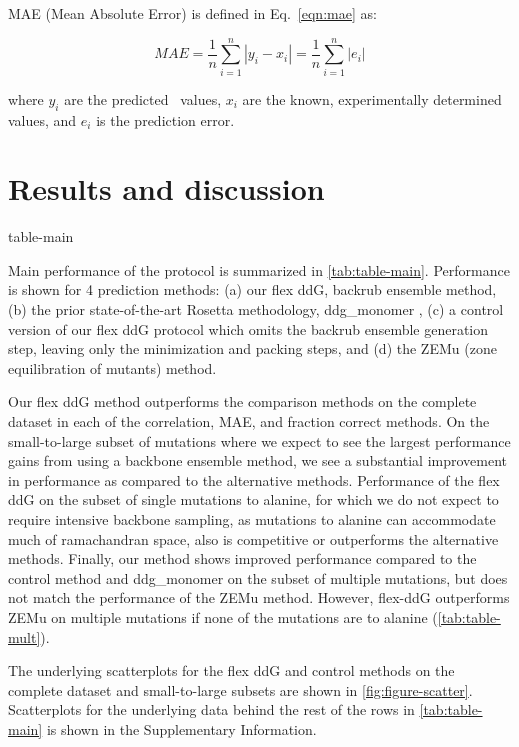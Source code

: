 MAE (Mean Absolute Error) is defined in Eq.~\ref{eqn:mae} as:

\begin{equation}\label{eqn:mae}
  MAE = \dfrac{1}{n}\sum\limits_{i=1}^n|y_i-x_i| = \dfrac{1}{n}\sum\limits_{i=1}^n|e_i|
\end{equation}

where $y_i$ are the predicted \ddg\ values, $x_i$ are the known, experimentally determined values, and $e_i$ is the prediction error.

\section{Results and discussion}

{table-main}

Main performance of the protocol is summarized in \cref{tab:table-main}. Performance is shown for 4 prediction methods: (a) our flex ddG, backrub ensemble method, (b) the prior state-of-the-art Rosetta methodology, ddg\_monomer \cite{kellogg_role_2011}, (c) a control version of our flex ddG protocol which omits the backrub ensemble generation step, leaving only the minimization and packing steps, and (d) the ZEMu (zone equilibration of mutants) method\cite{dourado_multiscale_2014}.

Our flex ddG method outperforms the comparison methods on the complete dataset in each of the correlation, MAE, and fraction correct methods. On the small-to-large subset of mutations where we expect to see the largest performance gains from using a backbone ensemble method, we see a substantial improvement in performance as compared to the alternative methods. Performance of the flex ddG on the subset of single mutations to alanine, for which we do not expect to require intensive backbone sampling, as mutations to alanine can accommodate much of ramachandran space\cite{cunningham_high-resolution_1989}, also is competitive or outperforms the alternative methods. Finally, our method shows improved performance compared to the control method and ddg\_monomer on the subset of multiple mutations, but does not match the performance of the ZEMu method.
However, flex-ddG outperforms ZEMu on multiple mutations if none of the mutations are to alanine (\cref{tab:table-mult}).

The underlying scatterplots for the flex ddG and control methods on the complete dataset and small-to-large subsets are shown in \cref{fig:figure-scatter}. Scatterplots for the underlying data behind the rest of the rows in \cref{tab:table-main} is shown in the Supplementary Information.

